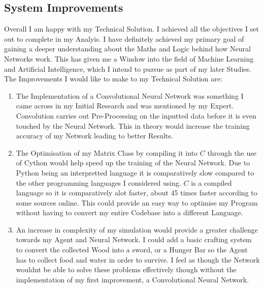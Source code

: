 \begin{flushleft}
        \vspace{0.5cm}

    \subsection{System Improvements}
        \vspace{0.2cm}
        Overall I am happy with my Technical Solution. I achieved all the objectives I set out to complete in my Analyis. I have definitely achieved
        my primary goal of gaining a deeper understanding about the Maths and Logic behind how Neural Networks work. This has given me a Window into
        the field of Machine Learning and Artificial Intelligence, which I intend to pursue as part of my later Studies. \\
        \vspace{0.2cm}
        The Improvements I would like to make to my Technical Solution are: \\
        \vspace{0.5cm}

        \begin{enumerate}
            \item The Implementation of a Convolutional Neural Network was something I came across in my Initial Research and was mentioned by my Expert.
            Convolution carries out Pre-Processing on the inputted data before it is even touched by the Neural Network. This in theory would increase
            the training accuracy of my Network leading to better Results. \\
            
            \vspace{0.2cm}
            \item The Optimisation of my Matrix Class by compiling it into $C$ through the use of Cython would help speed up the training of the Neural
            Network. Due to Python being an interpretted language it is comparatively slow compared to the other programming languages I considered
            using. $C$ is a compiled language so it is comparatively alot faster, about 45 times faster according to some sources online. This could
            provide an easy way to optimise my Program without having to convert my entire Codebase into a different Language. \\

            \vspace{0.2cm}
            \item An increase in complexity of my simulation would provide a greater challenge towards my Agent and Neural Network. I could add a basic
            crafting system to convert the collected Wood into a sword, or a Hunger Bar so the Agent has to collect food and water in order to survive.
            I feel as though the Network wouldnt be able to solve these problems effectively though without the implementation of my first improvement,
            a Convolutional Neural Network. \\

            \vspace{0.2cm}
        \end{enumerate}
        \vspace{0.5cm}
\end{flushleft}